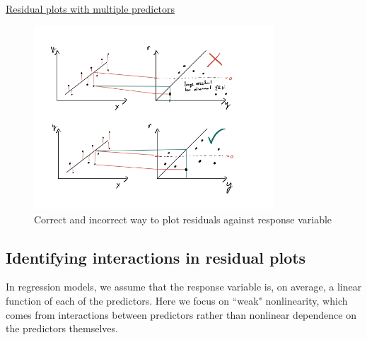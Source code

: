 \begin{example}
\href{https://colab.research.google.com/drive/1bBeb3k5xEjGInFtjhB7X8B0LXqkGI0Tn#scrollTo=Wt-Irm_AeY17&line=1&uniqifier=1}{Residual plots with multiple predictors}
\end{example}


\begin{figure}[h]
    \centering
    \includegraphics[width=0.8\textwidth]{res}
    \caption{Correct and incorrect way to plot residuals against response variable }
    \label{fig:res}
\end{figure}


\subsection{Identifying interactions in residual plots}


In regression models, we assume that the response variable is, on average, a linear function of each of the predictors. Here we focus on ``weak" nonlinearity, which comes from interactions between predictors rather than nonlinear dependence on the predictors themselves. 

